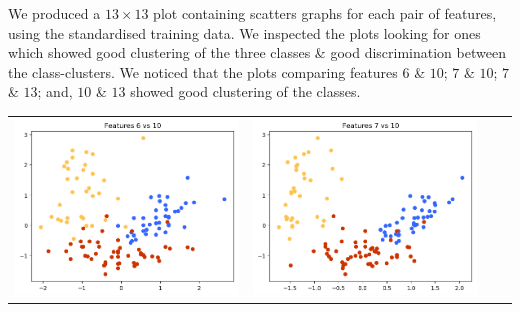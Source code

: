 \documentclass[11pt,a4paper]{article}
\begin{document}
\indent We produced a $13\times13$ plot containing scatters graphs for each pair of features, using the standardised training data. We inspected the plots looking for ones which showed good clustering of the three classes \& good discrimination between the class-clusters. We noticed that the plots comparing features $6$ \& $10$; $7$ \& $10$; $7$ \& $13$; and, $10$ \& $13$ showed good clustering of the classes.
\hspace*{-1.5cm}
\begin{tabular}{cccc}
\includegraphics[scale=0.3]{img/6x10.png}&
\includegraphics[scale=0.3]{img/7x10.png}&

\end{tabular}
\end{document}
